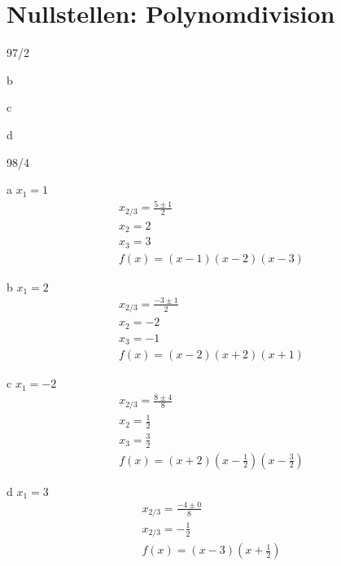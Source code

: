 \section{Nullstellen: Polynomdivision}
\begin{exercise}{97/2}
  \item [b]
  \item [c]
  \item [d]
\end{exercise}
\begin{exercise}{98/4}
  \item [a]
  $x_1 = 1$ \\
  \begin{gather*}
    x_{2/3} = \frac{5 \pm 1}{2} \\
    x_2 = 2 \\
    x_3 = 3 \\
    f(x) = (x - 1)(x - 2)(x - 3)
  \end{gather*}
  \newpage
  \item [b]
  $x_1 = 2$ \\
  \begin{gather*}
    x_{2/3} = \frac{-3 \pm 1}{2} \\
    x_2 = -2 \\
    x_3 = -1 \\
    f(x) = (x - 2)(x + 2)(x + 1)  
  \end{gather*}
  \item [c]
  $x_1 = -2$ \\
  \begin{gather*}
    x_{2/3} = \frac{8 \pm 4}{8} \\
    x_2 = \frac{1}{2} \\
    x_3 = \frac{3}{2} \\
    f(x) = (x + 2)(x - \frac{1}{2})(x - \frac{3}{2})
  \end{gather*}
  \newpage
  \item [d]
  $x_1 = 3$ \\
  \begin{gather*}
    x_{2/3} = \frac{-4 \pm 0}{8} \\
    x_{2/3} = -\frac{1}{2} \\
    f(x) = (x - 3)(x + \frac{1}{2})
  \end{gather*}
\end{exercise}
